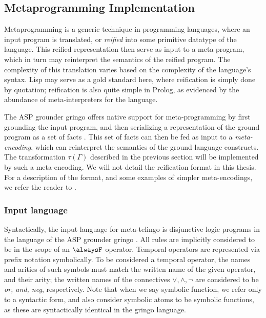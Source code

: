 \subsection{Metaprogramming Implementation}

Metaprogramming is a generic technique in programming languages, where
an input program is translated, or \emph{reified} into some primitive
datatype of the language. This reified representation then serve as
input to a meta program, which in turn may reinterpret the semantics
of the reified program. The complexity of this translation varies
based on the complexity of the language's syntax. Lisp may serve as a
gold standard here, where reification is simply done by quotation;
reification is also quite simple in Prolog, as evidenced by the
abundance of meta-interpreters for the language. 

The ASP grounder gringo offers native support for meta-programming by
first grounding the input program, and then serializing a
representation of the ground program as a set of facts
\cite{karoscwa21a}. This set of facts can then be fed as input to a
\emph{meta-encoding}, which can reinterpret the semantics of the
ground language constructs. The transformation $\tau(\Gamma)$
described in the previous section will be implemented by such a
meta-encoding. We will not detail the reification format in this
thesis. For a description of the format, and some examples of simpler
meta-encodings, we refer the reader to \cite{karoscwa21a}.

\subsubsection{Input language}

Syntactically, the input language for meta-telingo is disjunctive
logic programs in the language of the ASP grounder gringo
\cite{PotasscoUserGuide19} \cite{gescth07a}. All rules are implicitly
considered to be in the scope of an $\alwaysF$ operator. Temporal
operators are represented via prefix notation symbolically. To be
considered a temporal operator, the names and arities of such
symbols must match the written name of the given operator, and their
arity; the written names of the connectives $\vee, \wedge, \neg$ are
considered to be \emph{or, and, neg}, respectively. Note that when we
say symbolic function, we refer only to a syntactic form, and also
consider symbolic atoms to be symbolic functions, as these are
syntactically identical in the gringo language.

